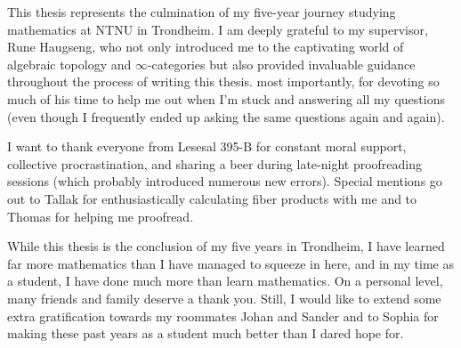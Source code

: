\documentclass[../../thesis.tex]{subfiles}
\begin{document}
This thesis represents the culmination of my five-year journey studying mathematics at NTNU in Trondheim. I am deeply grateful to my supervisor, Rune Haugseng, who not only introduced me to the captivating world of algebraic topology and $\infty$-categories but also provided invaluable guidance throughout the process of writing this thesis.
most importantly, for devoting so much of his time to help me out when I'm stuck and answering all my questions (even though I frequently ended up asking the same questions again and again).


I want to thank everyone from Lesesal 395-B for constant moral support, collective procrastination, and sharing a beer during late-night proofreading sessions (which probably introduced numerous new errors).
Special mentions go out to Tallak for enthusiastically calculating fiber products with me and to Thomas for helping me proofread.

While this thesis is the conclusion of my five years in Trondheim, I have learned far more mathematics than I have managed to squeeze in here, and in my time as a student, I have done much more than learn mathematics.
On a personal level, many friends and family deserve a thank you. Still, I would like to extend some extra gratification towards my roommates Johan and Sander and to Sophia for making these past years as a student much better than I dared hope for.
\end{document}
